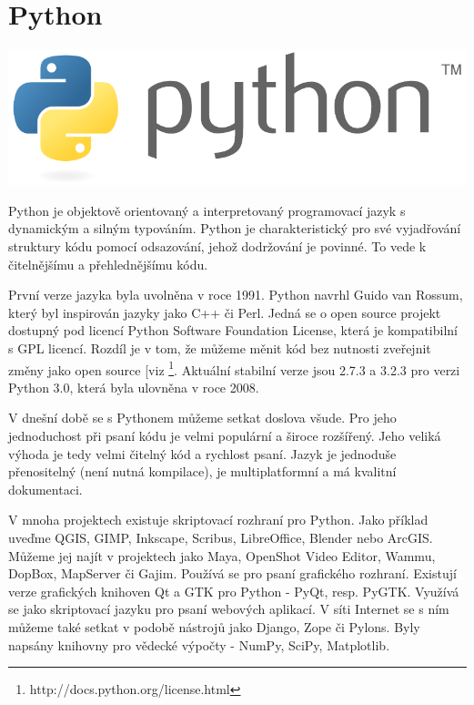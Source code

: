 \newpage
\section{Python}
\nocite{py3:book}


\begin{center}
	\includegraphics[scale=0.5]{pictures/python/logo.pdf}
\end{center}

Python je objektově orientovaný a interpretovaný programovací jazyk s dynamickým a silným typováním. Python je charakteristický pro své vyjadřování struktury kódu pomocí odsazování, jehož dodržování je povinné. To vede k čitelnějšímu a přehlednějšímu kódu. 


První verze jazyka byla uvolněna v roce 1991. Python navrhl Guido van Rossum, který byl inspirován jazyky jako C++ či Perl. Jedná se o open source projekt dostupný pod licencí Python Software Foundation License, která je kompatibilní s GPL licencí. Rozdíl je v tom, že můžeme měnit kód bez nutnosti zveřejnit změny jako open source [viz \footnote{http://docs.python.org/license.html}. Aktuální stabilní verze jsou 2.7.3 a 3.2.3 pro verzi Python 3.0, která byla ulovněna v roce 2008. 



V dnešní době se s Pythonem můžeme setkat doslova všude. Pro jeho jednoduchost při psaní kódu je velmi populární a široce rozšířený. Jeho veliká výhoda je tedy velmi čitelný kód a rychlost psaní. Jazyk je jednoduše přenositelný (není nutná kompilace), je multiplatformní a má kvalitní dokumentaci. 

V mnoha projektech existuje skriptovací rozhraní pro Python. Jako příklad uveďme QGIS, GIMP, Inkscape, Scribus, LibreOffice, Blender nebo ArcGIS. Můžeme jej najít v projektech jako Maya, OpenShot Video Editor, Wammu, DopBox, MapServer či Gajim. Používá se pro psaní grafického rozhraní. Existují verze grafických knihoven Qt a GTK pro Python - PyQt, resp. PyGTK. Využívá se jako skriptovací jazyku pro psaní webových aplikací. V síti Internet se s ním můžeme také setkat v podobě nástrojů jako Django, Zope či Pylons. Byly napsány knihovny pro vědecké výpočty - NumPy, SciPy, Matplotlib.

